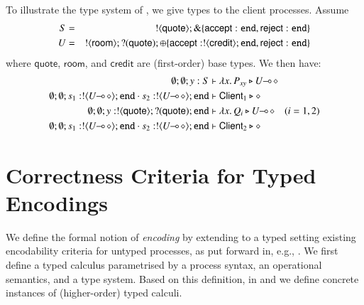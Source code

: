 \documentclass[preprint,11pt]{elsarticle}
\newtheorem{proposition}{Proposition}[section]
\newtheorem{example}{Example}[section]
\newcommand{\rtype}{\mathsf{room}}
\newcommand{\Quote}{\mathsf{quote}}
\newcommand{\accept}{\mathsf{accept}}
\newcommand{\reject}{\mathsf{reject}}
\newcommand{\creditc}{\mathsf{credit}}
\newcommand{\Client}{\mathsf{Client}}
\begin{document}
{{ 


To illustrate the type system of \HOp, we give types to the client
processes. %
Assume 
\begin{eqnarray*}
S & = & \btout{\Quote} \btbra{\accept: \tinact, \reject: \tinact} \\
U & = & \btout{\rtype} \btinp{\Quote} \btsel{\accept: \btout{\creditc} \tinact, \reject: \tinact }
\end{eqnarray*}
where $\Quote$, $\rtype$, and $\creditc$ are (first-order) base types.
We then have:
\begin{align*}
\es; \es; y: S & \proves \abs{x}{P_{xy}} \hastype \lhot{U}
\\
	\es; \es; s_1: \btout{\lhot{U}} \tinact \cat s_2: \btout{\lhot{U}} \tinact & \proves \Client_1 \hastype \Proc
\\
	\es; \es; y: \btout{\Quote} \btinp{\Quote} \tinact &\proves \abs{x}{Q_i} \hastype \lhot{U}
 \quad (i=1,2)
 \\
	\es; \es; s_1: \btout{\lhot{U}} \tinact \cat s_2: \btout{\lhot{U}} \tinact & \proves \Client_2 \hastype \Proc
\end{align*}

%

\section{Correctness Criteria for Typed Encodings}
\label{s:expr}
%
We define the formal notion of \emph{encoding} by 
extending to a typed setting existing encodability criteria for untyped processes, as put forward in, e.g.,
\cite{Nestmann00,Palamidessi03,DBLP:conf/lics/PalamidessiSVV06,DBLP:journals/iandc/Gorla10,DBLP:conf/icalp/LanesePSS10,DBLP:journals/tcs/FuL10,DBLP:journals/corr/abs-1208-2750,DBLP:conf/esop/PetersNG13}. 
We first define a typed calculus parametrised by a process syntax, an operational semantics, and a type system.
Based on this definition, in  
 and 
we define concrete instances of (higher-order) typed calculi.
}}
\end{document}

